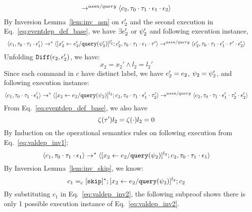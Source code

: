 \begin{subproof}
\begin{equation}
\begin{array}{l}
  \rightarrow^{assn/query} 
  \langle {c}_2,  \mathtt{\tau}_0 \cdot \mathtt{\tau}_1 \cdot \mathtt{\epsilon}_1 \cdot \mathtt{\epsilon}_2 \rangle 
\end{array}
\end{equation}
%
%
By Inversion Lemma~\ref{lem:inv_asn} on 
$\mathtt{\epsilon}_2'$ and the second execution in Eq.~\ref{eq:eventdep_def_base},
we have $\exists e_2'$ or $\psi_2'$ and following execution instance,
 \[
  \begin{array}{l}   
  \langle c_1, \mathtt{\tau}_0 \cdot \mathtt{\tau}_1 \cdot \mathtt{\epsilon}_1' \rangle 
  \rightarrow^{*} 
  \langle [\mathrel{ {x}_2' \leftarrow e_2' / {\tt query}(\psi_2') }]^{l_2'} ; {c}_2', \mathtt{\tau}_0 \cdot \mathtt{\tau}_1 \cdot \mathtt{\epsilon}_1 \cdot \mathtt{\tau}' \rangle 
  \rightarrow^{assn/query} 
  \langle {c}_2',  \mathtt{\tau}_0 \cdot \mathtt{\tau}_1 \cdot \mathtt{\epsilon}_1' \cdot \mathtt{\tau}' \cdot \mathtt{\epsilon}_2' \rangle 
\end{array}
 \]
%
Unfolding $\mathtt{Diff}(\mathtt{\epsilon}_2,\mathtt{\epsilon}_2')$, we have:
\[
  x_2 = x_2' \land l_2 = l_2' 
\] 
%
Since each command in $c$ have distinct label, we have $e_2' = e_2$, $\psi_2 = \psi_2'$, and following execution instance:
\begin{equation}
\label{eq:valdep_inv2}
  \langle c_1, \mathtt{\tau}_0 \cdot \mathtt{\tau}_1 \cdot \mathtt{\epsilon}_1' \rangle 
  \rightarrow^{*} 
  \langle [\mathrel{ {x}_2 \leftarrow e_2 / {\tt query}(\psi_2) }]^{l_2} ; {c}_2, \mathtt{\tau}_0 \cdot \mathtt{\tau}_1 \cdot \mathtt{\epsilon}_1' \cdot \mathtt{\tau}_2' \rangle 
  \rightarrow^{assn/query} 
  \langle {c}_2,  \mathtt{\tau}_0 \cdot \mathtt{\tau}_1 \cdot \mathtt{\epsilon}_1' \cdot \mathtt{\tau}_2' \cdot \mathtt{\epsilon}_2' \rangle 
\end{equation}
%
From Eq.~\ref{eq:eventdep_def_base}, we also have
\begin{equation}
\label{eq:valdep_invn}
  \mathtt{\zeta}(\mathtt{\tau}') l_2 = \mathtt{\zeta}( \cdot ) l_2 = 0
\end{equation}
%
%
By Induction on the operational semantics rules on following execution from Eq.~\ref{eq:valdep_inv1}:
 \[\langle c_1, \mathtt{\tau}_0 \cdot \mathtt{\tau}_1 \cdot \mathtt{\epsilon}_1 \rangle
  \rightarrow^{*} 
  \langle [\mathrel{ {x}_2 \leftarrow e_2 / {\tt query}(\psi_2) }]^{l_2};{c}_2, 
  \mathtt{\tau}_0 \cdot \mathtt{\tau}_1 \cdot \mathtt{\epsilon}_1 \rangle 
\]
By Inversion Lemma~\ref{lem:inv_skip}, we know:
 \[
 c_1 =_c 
 [\mathtt{skip}]{}^*;[\mathrel{ {x}_2 \leftarrow e_2 / {\tt query}(\psi_2) }]^{l_2};{c}_2
 \]
By substituting $c_1$ in Eq.~\ref{eq:valdep_inv2}, the following subproof shows there is only 1 possible execution instance of Eq.~\ref{eq:valdep_inv2}.
\begin{subproof}[Subproof]

\end{subproof}
\end{subproof}
